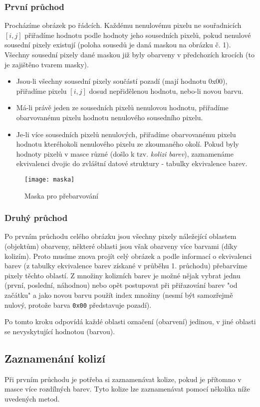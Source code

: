 \documentclass[12pt, a4paper]{article}
\begin{document}
\subsubsection{První průchod}
Procházíme obrázek po řádcích. Každému nenulovému pixelu ne souřadnicích $[i, j]$ přiřadíme hodnotu podle hodnoty jeho sousedních pixelů, pokud nenulové sousední pixely existují (poloha sousedů je daná maskou na obrázku č. 1). Všechny sousední pixely dané maskou již byly obarveny v předchozích krocích (to je zajištěno tvarem masky).
\begin{itemize}
  \item Jsou-li všechny sousední pixely součástí pozadí (mají hodnotu 0x00), přiřadíme pixelu $[i, j]$ dosud nepřidělenou hodnotu, nebo-li novou barvu.
  \item Má-li právě jeden ze sousedních pixelů nenulovou hodnotu, přiřadíme obarvovanému pixelu hodnotu nenulového sousedního pixelu.
  \item Je-li více sousedních pixelů nenulových, přiřadíme obarvovanému pixelu hodnotu kteréhokoli nenulového pixelu ze zkoumaného okolí. Pokud byly hodnoty pixelů v masce různé (došlo k tzv. {\it kolizi barev}), zaznamenáme ekvivalenci dvojic do zvláštní datové struktury - tabulky ekvivalence barev.
\end{itemize}
\begin{figure}[h!]
\centering 
\texttt{[image: maska]} 
\caption{Maska pro přebarvování \cite{Zadani}}
\label{maska}
\end{figure}

\subsubsection{Druhý průchod}
Po prvním průchodu celého obrázku jsou všechny pixely náležející oblastem (objektům) obarveny, některé oblasti jsou však obarveny více barvami (díky kolizím). Proto musíme znova projít celý obrázek a podle informací o ekvivalenci barev (z tabulky ekvivalence barev získané v průběhu 1. průchodu) přebarvíme pixely těchto oblastí. Z množiny kolizních barev je možné nějak vybrat jednu (první, poslední, náhodnou) nebo opět postupovat při přiřazování barev "od začátku" a jako novou barvu použít index množiny (nesmí být samozřejmě nulový, protože barva \texttt{0x00} představuje pozadí).

Po tomto kroku odpovídá každé oblasti označení (obarvení) jedinou, v jiné oblasti se nevyskytující hodnotou (barvou).

\subsection{Zaznamenání kolizí}
Při prvním průchodu je potřeba si zaznamenávat kolize, pokud je přítomno v masce více rozdílných barev. Tyto kolize lze zaznamenávat pomocí několika níže uvedených metod.
\end{document}
